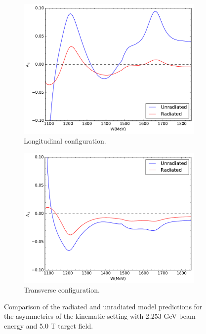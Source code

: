 \begin{figure}[p!]
  \centering
  \begin{subfigure}[t]{0.79\textwidth}
    \includegraphics[width=\textwidth]{figs/asymmetry-model-22535000.pdf}
    \caption{Longitudinal configuration. \label{C8S2F3a}}
  \end{subfigure}
  \begin{subfigure}[t]{0.79\textwidth}
    \includegraphics[width=\textwidth]{figs/asymmetry-model-22535090.pdf}
    \caption{Transverse configuration. \label{C8S2F3b}}
  \end{subfigure}
  \caption[Comparison of the radiated and unradiated model predictions.]{Comparison of the radiated and unradiated model predictions for the asymmetries of the kinematic setting with 2.253 GeV beam energy and 5.0 T target field. \label{C8S2F3}}
\end{figure}

